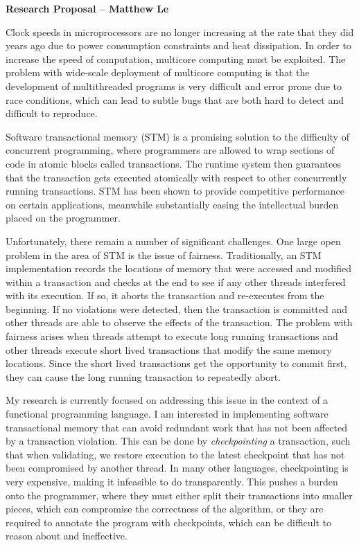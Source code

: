 \documentclass[12pt]{article}
\begin{document}
\centerline{\bf Research Proposal -- Matthew Le} 

Clock speeds in microprocessors are no longer increasing at the rate that they did years ago due to power consumption constraints and heat dissipation. In order to increase the speed of computation, multicore computing must be exploited. The problem with wide-scale deployment of multicore computing is that the development of multithreaded programs is very difficult and error prone due to race conditions, which can lead to subtle bugs that are both hard to detect and difficult to reproduce.

Software transactional memory (STM) is a promising solution to the difficulty of concurrent programming, where programmers are allowed to wrap sections of code in atomic blocks called transactions. The runtime system then guarantees that the transaction gets executed atomically with respect to other concurrently running transactions.  STM has been shown to provide competitive performance on certain applications, meanwhile substantially easing the intellectual burden placed on the programmer.

Unfortunately, there remain a number of significant challenges.  One large open problem in the area of STM is the issue of fairness.  Traditionally, an STM implementation records the locations of memory that were accessed and modified within a transaction and checks at the end to see if any other threads interfered with its execution.  If so, it aborts the transaction and re-executes from the beginning.  If no violations were detected, then the transaction is committed and other threads are able to observe the effects of the transaction.  The problem with fairness arises when threads attempt to execute long running transactions and other threads execute short lived transactions that modify the same memory locations.  Since the short lived transactions get the opportunity to commit first, they can cause the long running transaction to repeatedly abort.

My research is currently focused on addressing this issue in the context of a functional programming language.  I am interested in implementing software transactional memory that can avoid redundant work that has not been affected by a transaction violation.  This can be done by \emph{checkpointing} a transaction, such that when validating, we restore execution to the latest checkpoint that has not been compromised by another thread.  In many other languages, checkpointing is very expensive, making it infeasible to do transparently.  This pushes a burden onto the programmer, where they must either split their transactions into smaller pieces, which can compromise the correctness of the algorithm, or they are required to annotate the program with checkpoints, which can be difficult to reason about and ineffective.  
\end{document}
